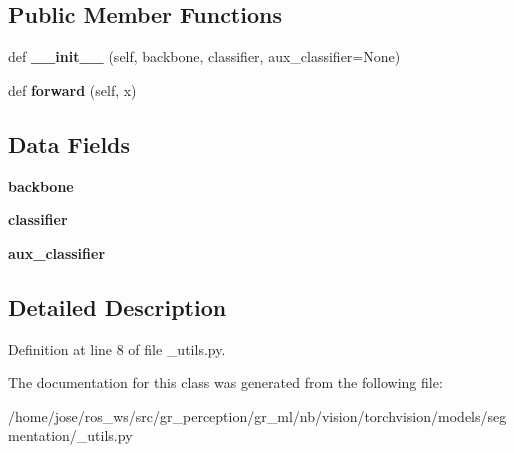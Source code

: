 \subsection*{Public Member Functions}
\begin{DoxyCompactItemize}
\item 
\mbox{\label{classtorchvision_1_1models_1_1segmentation_1_1__utils_1_1__SimpleSegmentationModel_acaef16d1af756c53b98270674286ed67}} 
def {\bfseries \+\_\+\+\_\+init\+\_\+\+\_\+} (self, backbone, classifier, aux\+\_\+classifier=None)
\item 
\mbox{\label{classtorchvision_1_1models_1_1segmentation_1_1__utils_1_1__SimpleSegmentationModel_ad3f553dfa2f6f5e1acf1223ae0ead28c}} 
def {\bfseries forward} (self, x)
\end{DoxyCompactItemize}
\subsection*{Data Fields}
\begin{DoxyCompactItemize}
\item 
\mbox{\label{classtorchvision_1_1models_1_1segmentation_1_1__utils_1_1__SimpleSegmentationModel_a3c4fbe181befc38130cafaadad235b18}} 
{\bfseries backbone}
\item 
\mbox{\label{classtorchvision_1_1models_1_1segmentation_1_1__utils_1_1__SimpleSegmentationModel_aee7a264bd50c3f2714937f5a8633b2fd}} 
{\bfseries classifier}
\item 
\mbox{\label{classtorchvision_1_1models_1_1segmentation_1_1__utils_1_1__SimpleSegmentationModel_a4b3d4afb07c52eafd29b28fd657c3efd}} 
{\bfseries aux\+\_\+classifier}
\end{DoxyCompactItemize}


\subsection{Detailed Description}


Definition at line 8 of file \+\_\+utils.\+py.



The documentation for this class was generated from the following file\+:\begin{DoxyCompactItemize}
\item 
/home/jose/ros\+\_\+ws/src/gr\+\_\+perception/gr\+\_\+ml/nb/vision/torchvision/models/segmentation/\+\_\+utils.\+py\end{DoxyCompactItemize}
